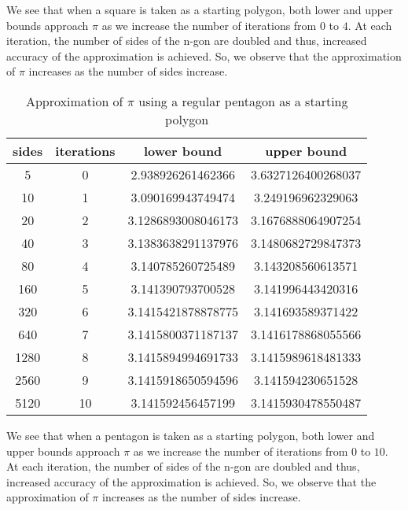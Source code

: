 \documentclass[12pt]{article}
\begin{document}
We see that when a square is taken as a starting polygon, both lower and upper bounds approach $\pi$ as we increase the number of iterations from $0$ to $4$. At each iteration, the number of sides of the n-gon are doubled and thus, increased accuracy of the approximation is achieved. So, we observe that the approximation of $\pi$ increases as the number of sides increase.\\
\bigskip
\bigskip
\bigskip
\bigskip
\bigskip
\bigskip


\begin{table}[h!]
  \begin{center}
    \caption{Approximation of $\pi$ using a regular pentagon as a starting polygon}
    \bigskip
    \label{tab:table2}
    \begin{tabular}{c|c|c|c}
      \textbf{sides} & \textbf{iterations} & \textbf{lower bound} & \textbf{upper bound}\\ %
      \hline
      5 & 0 & 2.938926261462366 & 3.6327126400268037\\ %
      10 & 1 & 3.090169943749474 & 3.249196962329063\\ %
      20 & 2 & 3.1286893008046173 & 3.1676888064907254\\ %
      40 & 3 & 3.1383638291137976 & 3.1480682729847373\\ %
      80 & 4 & 3.140785260725489 & 3.143208560613571\\ %
      160 & 5 & 3.141390793700528 & 3.141996443420316\\ %
      320 & 6 & 3.1415421878878775 & 3.141693589371422\\ %
      640 & 7 & 3.1415800371187137 & 3.1416178868055566\\ %
      1280 & 8 & 3.1415894994691733 & 3.1415989618481333\\ %
      2560 & 9 & 3.1415918650594596 & 3.141594230651528\\ %
      5120 & 10 & 3.141592456457199 & 3.1415930478550487\\ %
    \end{tabular}
  \end{center}
\end{table}

We see that when a pentagon is taken as a starting polygon, both lower and upper bounds approach $\pi$ as we increase the number of iterations from $0$ to $10$. At each iteration, the number of sides of the n-gon are doubled and thus, increased accuracy of the approximation is achieved. So, we observe that the approximation of $\pi$ increases as the number of sides increase.
\end{document}
